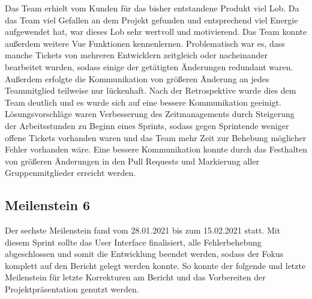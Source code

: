 \documentclass[10pt, a4paper]{article}
\begin{document}
\begin{onehalfspace}
Das Team erhielt vom Kunden für das bisher entstandene Produkt viel Lob.
Da das Team viel Gefallen an dem Projekt gefunden und entsprechend viel Energie aufgewendet hat, war dieses Lob sehr wertvoll und motivierend.
Das Team konnte außerdem weitere Vue Funktionen kennenlernen.
Problematisch war es, dass manche Tickets von mehreren Entwicklern zeitgleich oder nacheinander bearbeitet wurden, sodass einige der getätigten Änderungen redundant waren.
Außerdem erfolgte die Kommunikation von größeren Änderung an jedes Teammitglied teilweise nur lückenhaft.
Nach der Retrospektive wurde dies dem Team deutlich und es wurde sich auf eine bessere Kommunikation geeinigt.
Lösungsvorschläge waren Verbesserung des Zeitmanagements durch Steigerung der Arbeitsstunden zu Beginn eines Sprints, sodass gegen Sprintende weniger offene Tickets vorhanden waren und das Team mehr Zeit zur Behebung möglicher Fehler vorhanden wäre.
Eine bessere Kommunikation konnte durch das Festhalten von größeren Änderungen in den Pull Requests und Markierung aller Gruppenmitglieder erreicht werden.

\subsection{Meilenstein 6}
Der sechste Meilenstein fand vom 28.01.2021 bis zum 15.02.2021 statt.
Mit diesem Sprint sollte das User Interface finalisiert, alle Fehlerbehebung abgeschlossen und somit die Entwicklung beendet werden, sodass der Fokus komplett auf den Bericht gelegt werden konnte.
So konnte der folgende und letzte Meilenstein für letzte Korrekturen am Bericht und das Vorbereiten der Projektpräsentation genutzt werden.
\\~\\

\end{onehalfspace}
\end{document}
